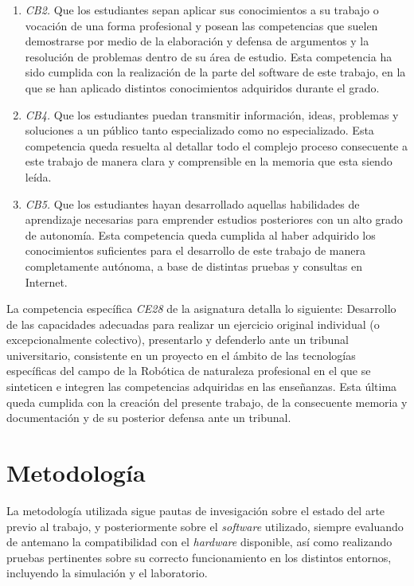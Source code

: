 \begin{enumerate}
    \item{\textit{CB2.} Que los estudiantes sepan aplicar sus conocimientos a su
        trabajo o vocación de una forma profesional y posean las competencias
        que suelen demostrarse por medio de la elaboración y defensa de
        argumentos y la resolución de problemas dentro de su área de estudio.}
        Esta competencia ha sido cumplida con la realización de la parte del
        software de este trabajo, en la que se han aplicado distintos
        conocimientos adquiridos durante el grado.
    \item{\textit{CB4.} Que los estudiantes puedan transmitir información,
        ideas, problemas y soluciones a un público tanto especializado como no
        especializado.}
        Esta competencia queda resuelta al detallar todo el complejo proceso
        consecuente a este trabajo de manera clara y comprensible en la memoria
        que esta siendo leída.
    \item{\textit{CB5.} Que los estudiantes hayan desarrollado aquellas
        habilidades de aprendizaje necesarias para emprender estudios
        posteriores con un alto grado de autonomía.}
        Esta competencia queda cumplida al haber adquirido los conocimientos
        suficientes para el desarrollo de este trabajo de manera completamente
        autónoma, a base de distintas pruebas y consultas en Internet.
\end{enumerate}

La competencia específica \textit{CE28} de la asignatura detalla lo
siguiente:
Desarrollo de las capacidades adecuadas para realizar un ejercicio original
individual (o excepcionalmente colectivo), presentarlo y defenderlo ante un
tribunal universitario, consistente en un proyecto en el ámbito de las
tecnologías específicas del campo de la Robótica de naturaleza profesional en el
que se sinteticen e integren las competencias adquiridas en las enseñanzas.
Esta última queda cumplida con la creación del presente trabajo, de la
consecuente memoria y documentación y de su posterior defensa ante un tribunal.


\section{Metodología}
\label{sec:metodologia}

La metodología utilizada sigue pautas de invesigación sobre el estado del arte
previo al trabajo, y posteriormente sobre el \textit{software} utilizado,
siempre evaluando de antemano la compatibilidad con el \textit{hardware}
disponible, así como realizando pruebas pertinentes sobre su correcto
funcionamiento en los distintos entornos, incluyendo la simulación y el
laboratorio.

